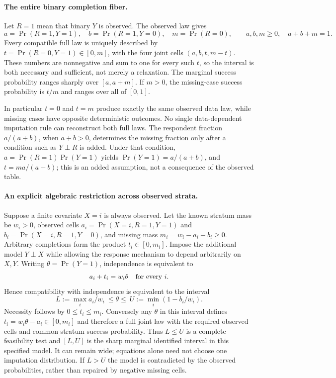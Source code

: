 \documentclass[11pt]{article}
\begin{document}
\paragraph{The entire binary completion fiber.}
Let $R=1$ mean that binary $Y$ is observed. The observed law gives
\[
a=\Pr(R=1,Y=1),\quad b=\Pr(R=1,Y=0),\quad
m=\Pr(R=0),\qquad a,b,m\ge0,\quad a+b+m=1.
\]
Every compatible full law is uniquely described by
$t=\Pr(R=0,Y=1)\in[0,m]$, with the four joint cells
$(a,b,t,m-t)$. These numbers are nonnegative and sum to one for every
such $t$, so the interval is both necessary and sufficient, not merely
a relaxation. The marginal success probability ranges sharply over
$[a,a+m]$. If $m>0$, the missing-case success probability is $t/m$
and ranges over all of $[0,1]$.

In particular $t=0$ and $t=m$ produce exactly the same observed data
law, while missing cases have opposite deterministic outcomes. No
single data-dependent imputation rule can reconstruct both full laws.
The respondent fraction $a/(a+b)$, when $a+b>0$, determines the missing
fraction only after a condition such as $Y\perp R$ is added. Under
that condition, $a=\Pr(R=1)\Pr(Y=1)$ yields
$\Pr(Y=1)=a/(a+b)$, and $t=m a/(a+b)$; this is an added assumption,
not a consequence of the observed table.

\paragraph{An explicit algebraic restriction across observed strata.}
Suppose a finite covariate $X=i$ is always observed. Let the known stratum
mass be $w_i>0$, observed cells $a_i=\Pr(X=i,R=1,Y=1)$ and
$b_i=\Pr(X=i,R=1,Y=0)$, and missing mass
$m_i=w_i-a_i-b_i\ge0$. Arbitrary completions form the product
$t_i\in[0,m_i]$. Impose the additional model $Y\perp X$ while
allowing the response mechanism to depend arbitrarily on $X,Y$.
Writing $\theta=\Pr(Y=1)$, independence is equivalent to
\[
a_i+t_i=w_i\theta\quad\hbox{for every }i.
\]
Hence compatibility with independence is equivalent to the interval
\[
L:=\max_i a_i/w_i\ \le\theta\le\
U:=\min_i(1-b_i/w_i).
\]
Necessity follows by $0\le t_i\le m_i$. Conversely any $\theta$
in this interval defines $t_i=w_i\theta-a_i\in[0,m_i]$ and therefore
a full joint law with the required observed cells and common stratum
success probability. Thus $L\le U$ is a complete feasibility test and
$[L,U]$ is the sharp marginal identified interval in this specified
model. It can remain wide; equations alone need not choose one
imputation distribution. If $L>U$ the model is contradicted by the
observed probabilities, rather than repaired by negative missing cells.
\end{document}
